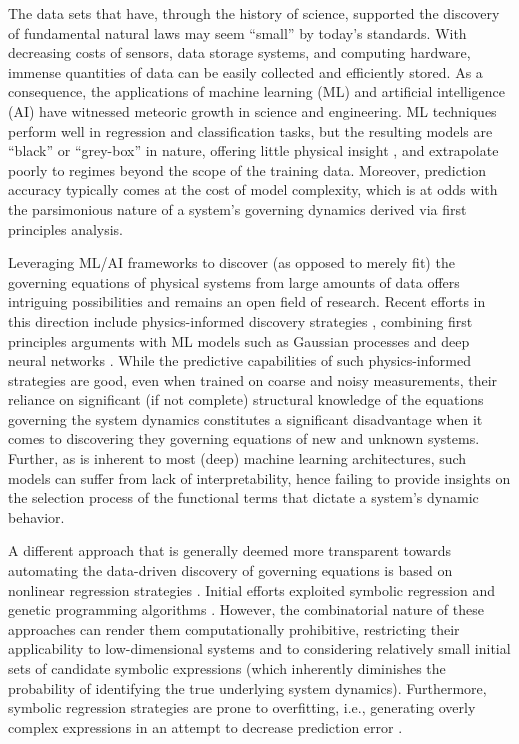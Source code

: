 \documentclass[12pt]{article}
\begin{document}
The data sets that have, through the history of science, supported the discovery of fundamental natural laws may seem ``small'' by today's standards. With decreasing costs of sensors, data storage systems, and computing hardware, immense quantities of data can be easily collected and efficiently stored. As a consequence, the applications of machine learning (ML) and artificial intelligence (AI) have witnessed meteoric growth in science and engineering. ML techniques perform well in regression and classification tasks, but the resulting models are   ``black'' or ``grey-box'' in nature, offering little physical insight \cite{roscher2020explainable}, and extrapolate poorly to regimes beyond the scope of the training data. Moreover, prediction accuracy typically comes at the cost of model complexity, which is at odds with the parsimonious  nature of a system's governing dynamics derived via first principles analysis.


Leveraging ML/AI frameworks to discover (as opposed to merely fit) the governing equations of physical systems from large amounts of data offers intriguing possibilities and remains an open field of research. Recent efforts in this direction include physics-informed discovery strategies \cite{karniadakis2021physics}, combining first principles arguments with ML models such as Gaussian processes \cite{raissi2018hidden} and deep neural networks \cite{raissi2019physics,long2019pde}. While the predictive capabilities of such physics-informed strategies are good, even when trained on coarse and noisy measurements, their reliance on significant (if not complete) structural knowledge of the equations governing the system dynamics constitutes a significant disadvantage when it comes to discovering they governing equations of new and unknown systems. Further, as is inherent to most (deep) machine learning architectures, such models can suffer from lack of interpretability, hence failing to provide insights on the selection process of the functional terms that dictate a system's dynamic behavior.

A  different approach that is generally deemed more transparent  towards automating the data-driven discovery of governing equations is based on nonlinear regression strategies \cite{james2013introduction}. Initial efforts exploited symbolic regression  \cite{king2004functional,bongard2007automated, schmidt2009distilling} and genetic programming algorithms \cite{koza1992genetic}. However, the combinatorial nature of these approaches can render them computationally prohibitive, restricting their applicability to low-dimensional systems and to considering relatively small initial sets of candidate symbolic expressions (which inherently diminishes the probability of identifying the true underlying system dynamics). Furthermore, symbolic regression strategies are prone to overfitting, i.e., generating overly complex expressions in an attempt to decrease prediction error \cite{schmidt2009distilling}.
\end{document}
